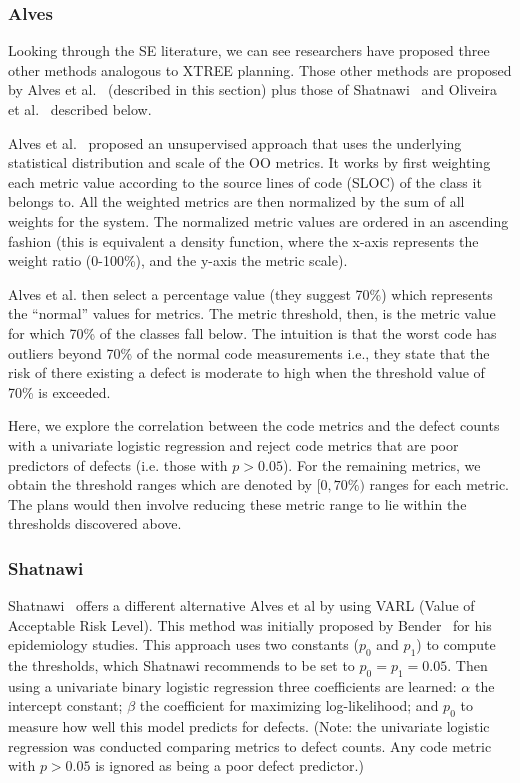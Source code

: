 \documentclass[10pt, journal, compsoc]{IEEEtran}
\begin{document}
\subsubsection{Alves}

Looking through the SE literature, we can see researchers have proposed three other methods  analogous to XTREE planning.
Those other methods are proposed by Alves et al.~\cite{alves} (described in this section) plus those of Shatnawi~\cite{shatnawi}
and Oliveira et al.~\cite{oliveira} described below.

Alves et al.~\cite{alves} proposed an unsupervised approach
that uses the underlying statistical 
distribution and scale of the OO metrics. It works by first weighting each metric value according to the source lines of 
code (SLOC) of the class it belongs to. All the weighted metrics are then normalized by the sum of all weights for the system. The normalized metric values are ordered in an ascending fashion (this is
equivalent a density function, where the x-axis represents 
the weight ratio (0-100\%), and the y-axis the metric scale).

Alves et al. then select a percentage value (they suggest 70\%) which 
represents the ``normal'' values for metrics. The metric threshold, then, 
is the metric value for which 70\% of the classes fall below. The 
intuition is that the worst code has outliers beyond 70\% of the normal 
code measurements i.e., they state that the risk of there existing a defect 
is moderate to high when the threshold value of 70\% is exceeded.

Here, we explore the correlation between the code metrics 
and the defect counts with a univariate logistic regression and reject 
code metrics that are poor predictors of defects (i.e.  those with $p > 
0.05$). For the remaining metrics, we obtain the threshold ranges which are denoted by $[0, 70\%)$ ranges for each metric. The plans would then involve reducing these metric range to lie within the thresholds discovered above.

\subsubsection{Shatnawi}

Shatnawi~\cite{shatnawi} offers a different alternative Alves et al by using VARL (Value of Acceptable Risk Level). This method was initially proposed by Bender~\cite{bender99} for his epidemiology studies. This approach uses two constants ($p_0$ and $p_1$) to compute the thresholds, which Shatnawi recommends to be set to $p_0=p_1=0.05$. Then using a univariate binary logistic regression three coefficients are learned:
$\alpha$ the intercept constant;
$\beta$ the coefficient for maximizing log-likelihood;
and $p_0$ to 
measure how well this model predicts for defects. (Note: the univariate 
logistic regression was conducted comparing metrics to defect counts. Any 
code metric with $p>0.05$ is ignored as being a poor defect predictor.)
\end{document}
